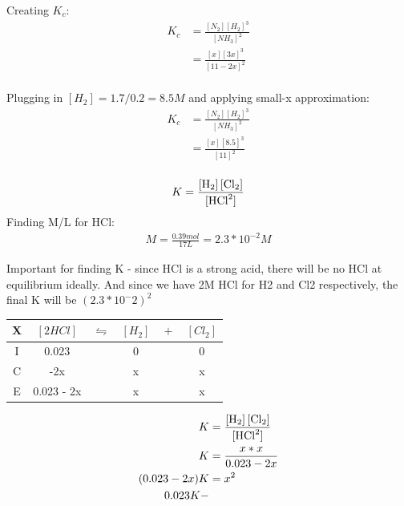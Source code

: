 \documentclass{article}  %
\begin{document}
Creating $K_c$:
\begin{equation*}
    \begin{aligned}
        K_c &= \frac{[N_2][H_2]^3}{[NH_3]^2} \\
            &= \frac{[x][3x]^3}{[11-2x]^2} \\
    \end{aligned}
\end{equation*}

Plugging in $[H_2] = 1.7/0.2 = 8.5M$ and applying small-x approximation:
\begin{equation*}
    \begin{aligned}
        K_c &= \frac{[N_2][H_2]^3}{[NH_3]^2} \\
            &= \frac{[x][8.5]^3}{[11]^2} \\
    \end{aligned}
\end{equation*}

\begin{equation*}
    \begin{aligned}
        K = \ce{\frac{[H_2] [Cl_2]}{[HCl^2]}}
    \end{aligned}
\end{equation*}
Finding M/L for HCl:
\begin{equation*}
    \begin{aligned}
        M = \frac{0.39mol}{17L} = 2.3*10^{-2}M
    \end{aligned}
\end{equation*}

Important for finding K - since HCl is a strong acid, there will be no HCl at equilibrium ideally. And since we have 2M HCl for H2 and Cl2 respectively, the final K will be $\left(2.3*10^-2\right)^2$

\begin{tabular}{c|c@{}c@{}c@{}c@{}c}
    \hline
    X   &   $[2HCl]$ & ${}\leftrightharpoons{}$ & $[H_2]$ & ${}+{}$ & $[Cl_2]$\\
    \hline
    I   &  0.023     &&   0                            &&  0       \\
    C   &       -2x      &&   x                           &&  x      \\
    E   &   0.023 - 2x     &&   x                           &&  x      \\
    \hline
\end{tabular}

\begin{equation*}
    \begin{aligned}
        K &= \ce{\frac{[H_2] [Cl_2]}{[HCl^2]}} \\
        K &= \frac{x*x}{0.023 - 2x} \\
        (0.023 - 2x)K &= x^2 \\
        0.023K - 
    \end{aligned}
\end{equation*}
\end{document}
